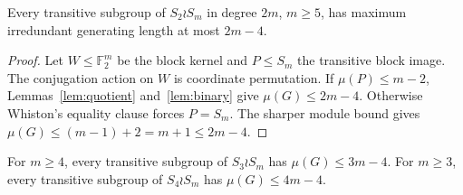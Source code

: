 \begin{theorem}\label{thm:twoblocks}
Every transitive subgroup of $S_2\wr S_m$ in degree $2m$, $m\geq5$,
has maximum irredundant generating length at most $2m-4$.
\end{theorem}
\begin{proof}
Let $W\leq\mathbb F_2^m$ be the block kernel and $P\leq S_m$ the
transitive block image. The conjugation action on $W$ is coordinate
permutation. If $\mu(P)\leq m-2$, Lemmas~\ref{lem:quotient}
and~\ref{lem:binary} give $\mu(G)\leq2m-4$. Otherwise Whiston's
equality clause forces $P=S_m$. The sharper module bound gives
$\mu(G)\leq(m-1)+2=m+1\leq2m-4$.
\end{proof}

\begin{lemma}\label{lem:smallbase}
For $m\geq4$, every transitive subgroup of $S_3\wr S_m$ has
$\mu(G)\leq3m-4$. For $m\geq3$, every transitive subgroup of
$S_4\wr S_m$ has $\mu(G)\leq4m-4$.
\end{lemma}
